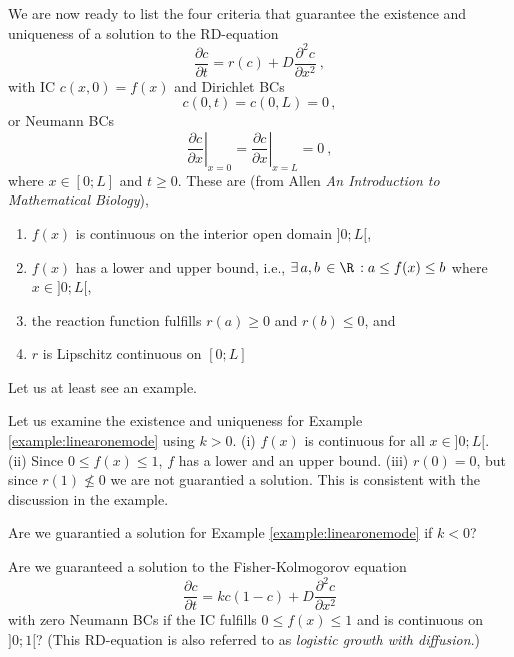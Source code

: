 We are now ready to list the four criteria that guarantee the existence and
uniqueness of a solution to the RD-equation 
\begin{equation}
  \frac{\partial c}{\partial t} = r(c) + D \frac{\partial^2 c}{\partial x^2}
 \ ,  
\end{equation}
with IC $c(x,0)=f(x)$ and Dirichlet BCs
\begin{equation}
   c(0,t)=c(0,L)=0 \, ,
\end{equation}
or Neumann BCs
\begin{equation}
    \left.\frac{\partial c}{\partial x}\right|_{x=0} = 
  \left.\frac{\partial c}{\partial x}\right|_{x=L} = 0 \ , 
\end{equation}
where  $x \in [0;L]$ and $t \geq 0$. These are (from Allen
\textit{An Introduction to Mathematical Biology}),
\begin{enumerate}
\item{$f(x)$ is continuous on the interior open domain $]0;L[$,}
\item{$f(x)$ has a lower and upper bound, i.e.,
    $\exists \, a,b \, \in \R \, : a\leq f(x) \leq b$ where
    $x \in ]0;L[$,}
\item{the reaction function fulfills $r(a) \geq 0$ and $r(b) \leq 0$, and }
\item{$r$ is Lipschitz continuous on $[0;L]$}
\end{enumerate}
Let us at least see an example.

\begin{example}
  Let us examine the existence and uniqueness for Example
  \ref{example:linearonemode} using $k>0$. (i) $f(x)$
  is continuous for all $x \in ]0;L[$. (ii) Since $0\leq f(x) \leq 1$, $f$
  has a lower and an upper bound. (iii) $r(0) = 0$, but since $r(1) \not\leq
  0$ we are not guarantied a solution. This is consistent with the discussion in
  the example.
\end{example}

\begin{question}
	Are we guarantied a solution for Example \ref{example:linearonemode} if $k<0$?
\end{question}

\begin{exerciseregion}
  \begin{exercise}
    Are we guaranteed a solution to the Fisher-Kolmogorov equation
    \begin{equation}
      \frac{\partial c}{\partial t} = kc(1-c) + D \frac{\partial^2c}{\partial x^2}  
    \end{equation}
	  with zero Neumann BCs if the IC fulfills 
	  $0\leq f(x) \leq 1$ and is continuous on $]0; 1[$? (This RD-equation is also referred to 
	  as \emph{logistic growth with diffusion}.)
  \end{exercise}
\end{exerciseregion}






